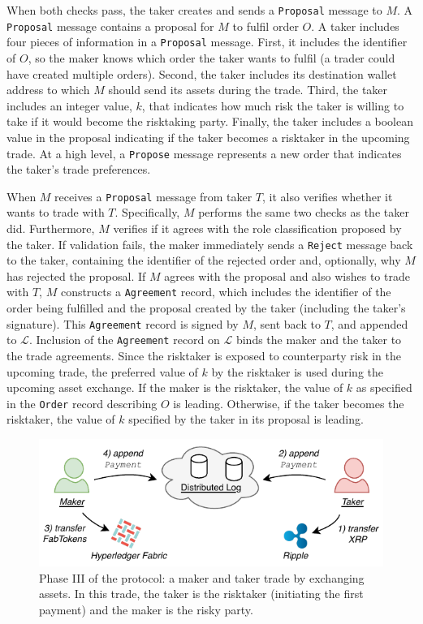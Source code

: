 When both checks pass, the taker creates and sends a \texttt{Proposal} message to $ M $.
A \texttt{Proposal} message contains a proposal for $ M $ to fulfil order $ O $.
A taker includes four pieces of information in a \texttt{Proposal} message.
First, it includes the identifier of $ O $, so the maker knows which order the taker wants to fulfil (a trader could have created multiple orders).
Second, the taker includes its destination wallet address to which $ M $ should send its assets during the trade.
Third, the taker includes an integer value, $ k $, that indicates how much risk the taker is willing to take if it would become the risktaking party.
Finally, the taker includes a boolean value in the proposal indicating if the taker becomes a risktaker in the upcoming trade.
At a high level, a \texttt{Propose} message represents a new order that indicates the taker's trade preferences.

When $ M $ receives a \texttt{Proposal} message from taker $ T $, it also verifies whether it wants to trade with $ T $.
Specifically, $ M $ performs the same two checks as the taker did.
Furthermore, $ M $ verifies if it agrees with the role classification proposed by the taker.
If validation fails, the maker immediately sends a \texttt{Reject} message back to the taker, containing the identifier of the rejected order and, optionally, why $ M $ has rejected the proposal.
If $ M $ agrees with the proposal and also wishes to trade with $ T $, $ M $ constructs a \texttt{Agreement} record, which includes the identifier of the order being fulfilled and the proposal created by the taker (including the taker's signature).
This \texttt{Agreement} record is signed by $ M $, sent back to $ T $, and appended to $ \mathcal{L} $.
Inclusion of the \texttt{Agreement} record on $ \mathcal{L} $ binds the maker and the taker to the trade agreements.
Since the risktaker is exposed to counterparty risk in the upcoming trade, the preferred value of $ k $ by the risktaker is used during the upcoming asset exchange.
If the maker is the risktaker, the value of $ k $ as specified in the \texttt{Order} record describing $ O $ is leading.
Otherwise, if the taker becomes the risktaker, the value of $ k $ specified by the taker in its proposal is leading.

\begin{figure}[h]
	\centering
	\includegraphics[width=0.8\linewidth]{xchange/assets/xchange_protocol_3}
	\caption{Phase III of the \ModelName{} protocol: a maker and taker trade by exchanging assets. In this trade, the taker is the risktaker (initiating the first payment) and the maker is the risky party.}
	\label{fig:xchange_protocol_3}
\end{figure}

